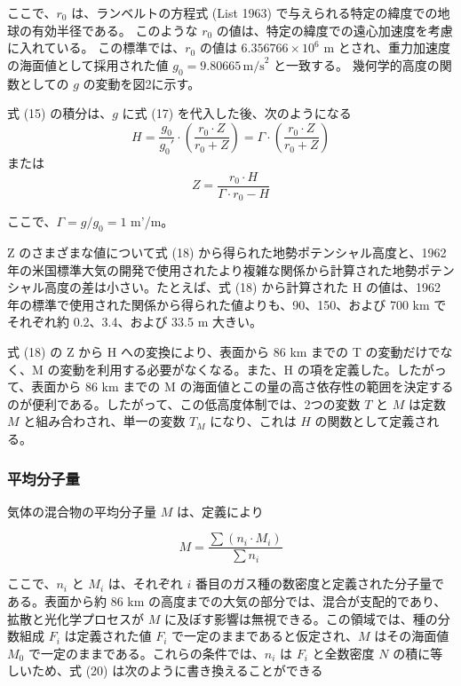 \documentclass{article}
\begin{document}
ここで、$r_0$ は、ランベルトの方程式 (List 1963) で与えられる特定の緯度での地球の有効半径である。
このような $r_0$ の値は、特定の緯度での遠心加速度を考慮に入れている。
この標準では、$r_0$ の値は $6.356766 \times 10^6$ m とされ、重力加速度の海面値として採用された値 $g_0 = 9.80665 \, \text{m/s}^2$ と一致する。
幾何学的高度の関数としての $g$ の変動を図2に示す。

式 (15) の積分は、$g$ に式 (17) を代入した後、次のようになる
\begin{equation}
 H = \frac{g_0}{g_0\text{$'$}} \cdot (\frac{r_0 \cdot Z}{r_0+Z}) = \Gamma \cdot(\frac{r_0\cdot Z}{r_0+Z}) \tag{18}
\end{equation}
または
\begin{equation}
 Z = \frac{r_0 \cdot H}{ \Gamma \cdot r_0 - H} \tag{19}
\end{equation}

ここで、$\Gamma = g/g_0 = 1$ m'/m。

Z のさまざまな値について式 (18) から得られた地勢ポテンシャル高度と、1962 年の米国標準大気の開発で使用されたより複雑な関係から計算された地勢ポテンシャル高度の差は小さい。たとえば、式 (18) から計算された H の値は、1962 年の標準で使用された関係から得られた値よりも、90、150、および 700 km でそれぞれ約 0.2、3.4、および 33.5 m 大きい。

式 (18) の Z から H への変換により、表面から 86 km までの T の変動だけでなく、M の変動を利用する必要がなくなる。また、H の項を定義した。したがって、表面から 86 km までの M の海面値とこの量の高さ依存性の範囲を決定するのが便利である。したがって、この低高度体制では、2つの変数 $T$ と $M$ は定数 $M$ と組み合わされ、単一の変数 $T_M$ になり、これは $H$ の関数として定義される。

\subsubsection{平均分子量}
気体の混合物の平均分子量 $M$ は、定義により

\begin{equation}
 M = \frac{\sum (n_i \cdot M_i)}{\sum n_i} \tag{20}
\end{equation}

ここで、$n_i$ と $M_i$ は、それぞれ $i$ 番目のガス種の数密度と定義された分子量である。表面から約 86 km の高度までの大気の部分では、混合が支配的であり、拡散と光化学プロセスが $M$ に及ぼす影響は無視できる。この領域では、種の分数組成 $F_i$ は定義された値 $F_i$ で一定のままであると仮定され、$M$ はその海面値 $M_0$ で一定のままである。これらの条件では、$n_i$ は $F_i$ と全数密度 $N$ の積に等しいため、式 (20) は次のように書き換えることができる
\end{document}
